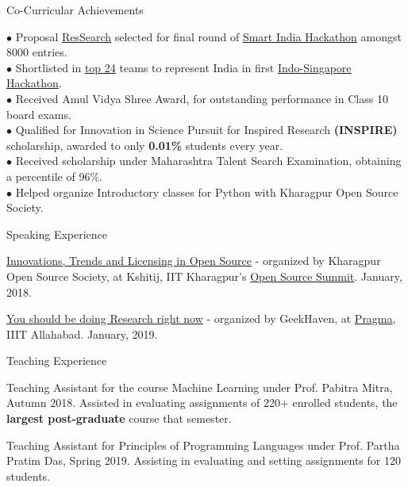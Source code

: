 \documentclass{resume} %
\begin{document}
\begin{rSection}{Co-Curricular Achievements}

$\bullet$ Proposal \href{https://docs.google.com/presentation/d/1ndJbIQCxFEf__I55yOOME-a_UGWDv1KMlukVE2lbDeA/}{ResSearch} selected for final round of \href{https://drive.google.com/open?id=0B5iU6cWw36rOamZLWHZENWdlY0k}{Smart India Hackathon} amongst 8000 entries. \\
$\bullet$ Shortlisted in \href{https://www.aicte-india.org/sites/default/files/Shortlisted and waitlisted Teams indo singapore hackathon 2018.pdf}{top 24} teams to represent India in first \href{http://www.ntu.edu.sg/events/events/Pages/Singapore-India-Hackathon-20181002-2080.aspx}{Indo-Singapore Hackathon}.\\
$\bullet$ Received Amul Vidya Shree Award, for outstanding performance in Class 10 board exams.\\
$\bullet$ Qualified for Innovation in Science Pursuit for Inspired Research {\bf \large (INSPIRE)} scholarship, awarded to only \textbf{0.01\%} students every year. \\
$\bullet$ Received scholarship under Maharashtra Talent Search Examination, obtaining a percentile of 96\%.\\
$\bullet$ Helped organize Introductory classes for Python with Kharagpur Open Source Society.


\begin{rSubsection}{\large Speaking Experience}{}{}{}
\item \href{https://www.youtube.com/watch?v=lk4ciY3NSbA}{Innovations, Trends and Licensing in Open Source} - organized by Kharagpur Open Source Society, at Kshitij, IIT Kharagpur's \href{https://www.facebook.com/events/1387262571380225/}{Open Source Summit}. January, 2018.
\item \href{https://twitter.com/IIITAPragma/status/1085833015995953152}{You should be doing Research right now} - organized by GeekHaven, at \href{https://pragmaconf.tech}{Pragma}, IIIT Allahabad. January, 2019.

\end{rSubsection}


\begin{rSubsection}{\large Teaching Experience}{}{}{}
\item Teaching Assistant for the course Machine Learning under Prof. Pabitra Mitra, Autumn 2018. Assisted in evaluating assignments of 220+ enrolled students, the \textbf{largest post-graduate} course that semester.
\item Teaching Assistant for Principles of Programming Languages under Prof. Partha Pratim Das, Spring 2019. Assisting in evaluating and setting assignments for 120 students.


\end{rSubsection}
\end{rSection}
\end{document}
